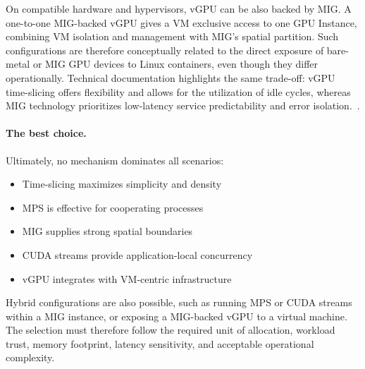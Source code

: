 On compatible hardware and hypervisors, vGPU can be also backed by MIG. A one-to-one MIG-backed vGPU gives a VM exclusive access to one GPU Instance, combining VM isolation and management with MIG's spatial partition. Such configurations are therefore conceptually related to the direct exposure of bare-metal or MIG GPU devices to Linux containers, even though they differ operationally. Technical documentation highlights the same trade-off: vGPU time-slicing offers flexibility and allows for the utilization of idle cycles, whereas MIG technology prioritizes low-latency service predictability and error isolation.~\cite{nvidia2020migvcs}.

\paragraph{The best choice.}
Ultimately, no mechanism dominates all scenarios:
\begin{itemize}
    \item Time-slicing maximizes simplicity and density
    \item MPS is effective for cooperating processes
    \item MIG supplies strong spatial boundaries
    \item CUDA streams provide application-local concurrency
    \item vGPU integrates with VM-centric infrastructure
\end{itemize}
Hybrid configurations are also possible, such as running MPS or CUDA streams within a MIG instance, or exposing a MIG-backed vGPU to a virtual machine. The selection must therefore follow the required unit of allocation, workload trust, memory footprint, latency sensitivity, and acceptable operational complexity.

